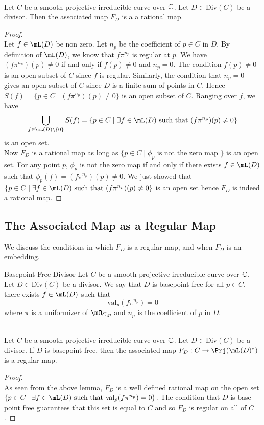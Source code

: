 \documentclass[a4paper]{article}
\begin{document}
\begin{lmm}{}{}\\
Let $C$ be a smooth projective irreducible curve over $\mathbb{C}$. Let $D\in\text{Div}(C)$ be a divisor. Then the associated map $F_D$ is a a rational map. 
\begin{proof}\\
Let $f\in\mL(D)$ be non zero. Let $n_p$ be the coefficient of $p\in C$ in $D$. By definition of $\mL(D)$, we know that $f\pi^{n_p}$ is regular at $p$. We have $(f\pi^{n_p})(p)\neq 0$ if and only if $f(p)\neq 0$ and $n_p=0$. The condition $f(p)\neq 0$ is an open subset of $C$ since $f$ is regular. Similarly, the condition that $n_p=0$ gives an open subset of $C$ since $D$ is a finite sum of points in $C$. Hence $S(f)=\{p\in C\;|\;(f\pi^{n_p})(p)\neq 0\}$ is an open subset of $C$. Ranging over $f$, we have $$\bigcup_{f\in\mL(D)\setminus\{0\}}S(f)=\{p\in C\;|\;\exists f\in\mL(D)\text{ such that }(f\pi^{n_p})(p)\neq 0\}$$ is an open set. \\

Now $F_D$ is a rational map as long as $\{p\in C\;|\;\phi_p\text{ is not the zero map }\}$ is an open set. For any point $p$, $\phi_p$ is not the zero map if and only if there exists $f\in\mL(D)$ such that $\phi_p(f)=(f\pi^{n_p})(p)\neq 0$. We just showed that $\{p\in C\;|\;\exists f\in\mL(D)\text{ such that }(f\pi^{n_p})(p)\neq 0\}$ is an open set hence $F_D$ is indeed a rational map. 
\end{proof}
\end{lmm}

\subsection{The Associated Map as a Regular Map}
We discuss the conditions in which $F_D$ is a regular map, and when $F_D$ is an embedding. 

\begin{defn}{Basepoint Free Divisor}{} Let $C$ be a smooth projective irreducible curve over $\mathbb{C}$. Let $D\in\text{Div}(C)$ be a divisor. We say that $D$ is basepoint free for all $p\in C$, there exists $f\in\mL(D)$ such that $$\text{val}_p(f\pi^{n_p})=0$$ where $\pi$ is a uniformizer of $\mO_{C,p}$ and $n_p$ is the coefficient of $p$ in $D$. 
\end{defn}

\begin{lmm}{}{}\\
Let $C$ be a smooth projective irreducible curve over $\mathbb{C}$. Let $D\in\text{Div}(C)$ be a divisor. If $D$ is basepoint free, then the associated map $F_D:C\to\Prj(\mL(D)^\ast)$ is a regular map. 
\begin{proof}\\
As seen from the above lemma, $F_D$ is a well defined rational map on the open set $\{p\in C\;|\;\exists f\in\mL(D)\text{ such that }\text{val}_p(f\pi^{n_p})=0\}$. The condition that $D$ is base point free guarantees that this set is equal to $C$ and so $F_D$ is regular on all of $C$. 
\end{proof}
\end{lmm}
\end{document}
